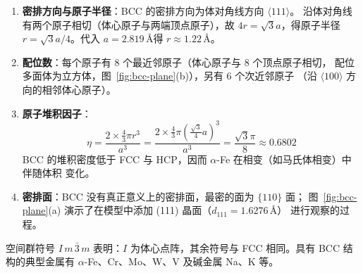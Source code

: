 \begin{enumerate}[label=（\arabic*）]
  \item \textbf{密排方向与原子半径}：BCC 的密排方向为体对角线方向 $\langle111\rangle$。
    沿体对角线有两个原子相切（体心原子与两端顶点原子），故 $4r=\sqrt{3}a$，得原子半径
    $r=\sqrt{3}a/4$。代入 $a=2.819$\,\AA 得 $r\approx1.22$\,\AA。
  \item \textbf{配位数}：每个原子有 8 个最近邻原子（体心原子与 8 个顶点原子相切，
    配位多面体为立方体，图~\ref{fig:bcc-plane}(b)），另有 6 个次近邻原子
    （沿 $\langle100\rangle$ 方向的相邻体心原子）。
  \item \textbf{原子堆积因子}：
    \begin{equation}
      \eta=\frac{2\times\frac{4}{3}\pi r^3}{a^3}
        =\frac{2\times\frac{4}{3}\pi\left(\frac{\sqrt{3}}{4}a\right)^3}{a^3}
        =\frac{\sqrt{3}\pi}{8}\approx0.6802
    \end{equation}
    BCC 的堆积密度低于 FCC 与 HCP，因而 $\alpha$-Fe 在相变（如马氏体相变）中伴随体积
    变化。
  \item \textbf{密排面}：BCC 没有真正意义上的密排面，最密的面为 $\{110\}$ 面；
    图~\ref{fig:bcc-plane}(a) 演示了在模型中添加 (111) 晶面（$d_{111}=1.6276$\,\AA）
    进行观察的过程。
\end{enumerate}

空间群符号 $I\,m\,\bar3\,m$ 表明：$I$ 为体心点阵，其余符号与 FCC 相同。具有 BCC
结构的典型金属有 $\alpha$-Fe、Cr、Mo、W、V 及碱金属 Na、K 等。
